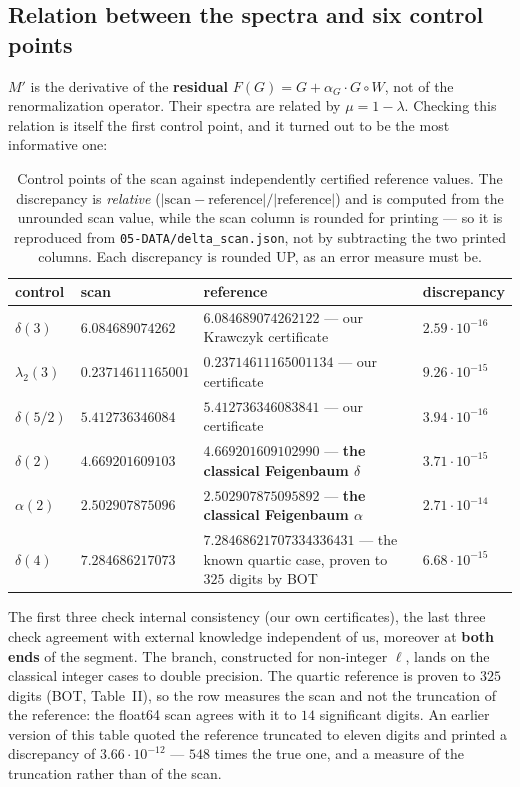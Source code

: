 \subsection{Relation between the spectra and six control points}
\label{sec:7.1}

$M'$ is the derivative of the \textbf{residual} $F(G) = G + \alpha_G\cdot G\circ W$, not of the
renormalization operator. Their spectra are related by $\mu = 1 - \lambda$. Checking
this relation is itself the first control point, and it turned out to be the
most informative one:

\begin{table}[ht]
\centering
\caption{Control points of the scan against independently certified reference
values. The discrepancy is \emph{relative} ($|\mathrm{scan}-\mathrm{reference}|
/ |\mathrm{reference}|$) and is computed from the unrounded scan value, while
the scan column is rounded for printing --- so it is reproduced from
\texttt{05-\allowbreak DATA/\allowbreak delta\_\allowbreak scan.json}, not by
subtracting the two printed columns. Each discrepancy is rounded UP, as an error measure must be.}
\label{tab:control-points}
{\small\setlength{\tabcolsep}{4pt}
\begin{tabular}{ll>{\raggedright\arraybackslash}p{}l}
\toprule
control & scan & reference & discrepancy \\
\midrule
$\delta(3)$ & $6.084689074262$ & $6.084689074262122$ --- our Krawczyk certificate & $2.59\cdot 10^{-16}$ \\
$\lambda_{2}(3)$ & $0.23714611165001$ & $0.23714611165001134$ --- our certificate & $9.26\cdot 10^{-15}$ \\
$\delta(5/2)$ & $5.412736346084$ & $5.412736346083841$ --- our certificate & $3.94\cdot 10^{-16}$ \\
$\delta(2)$ & $4.669201609103$ & $4.669201609102990$ --- \textbf{the classical Feigenbaum $\delta$} & $3.71\cdot 10^{-15}$ \\
$\alpha(2)$ & $2.502907875096$ & $2.502907875095892$ --- \textbf{the classical Feigenbaum $\alpha$} & $2.71\cdot 10^{-14}$ \\
$\delta(4)$ & $7.284686217073$ & $7.28468621707334336431$ --- the known quartic case, proven to $325$ digits by BOT & $6.68\cdot 10^{-15}$ \\
\bottomrule
\end{tabular}}
\end{table}
\FloatBarrier

The first three check internal consistency (our own certificates), the last
three check agreement with external knowledge independent of us, moreover at
\textbf{both ends} of the segment. The branch, constructed for non-integer $\ell$,
lands on the classical integer cases to double precision. The quartic reference is proven to $325$ digits
(BOT, Table~II), so the row measures the scan and not the truncation of the
reference: the float64 scan agrees with it to $14$ significant digits. An
earlier version of this table quoted the reference truncated to eleven digits and
printed a discrepancy of $3.66\cdot 10^{-12}$ --- $548$ times the true one, and a
measure of the truncation rather than of the scan.


